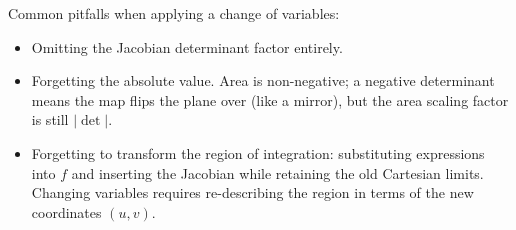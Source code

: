 \begin{trapbox}
Common pitfalls when applying a change of variables:
\begin{itemize}
\item Omitting the Jacobian determinant factor entirely.
\item Forgetting the absolute value. Area is non-negative; a negative determinant
means the map flips the plane over (like a mirror), but the area scaling factor is
still $|\det|$.
\item Forgetting to transform the region of integration: substituting expressions into $f$
and inserting the Jacobian while retaining the old Cartesian limits. Changing variables
requires re-describing the region in terms of the new coordinates $(u,v)$.
\end{itemize}
\end{trapbox}

